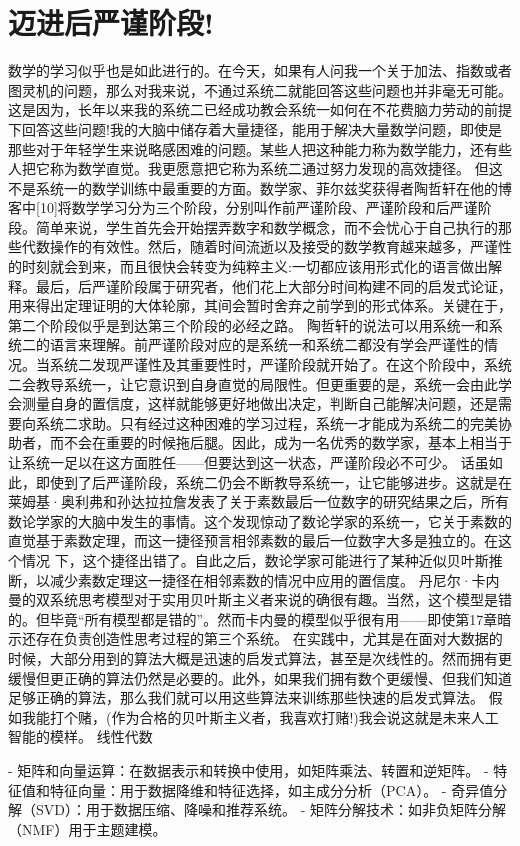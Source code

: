 \section{迈进后严谨阶段!}
数学的学习似乎也是如此进行的。在今天，如果有人问我一个关于加法、指数或者图灵机的问题，那么对我来说，不通过系统二就能回答这些问题也并非毫无可能。这是因为，长年以来我的系统二已经成功教会系统一如何在不花费脑力劳动的前提下回答这些问题!我的大脑中储存着大量捷径，能用于解决大量数学问题，即使是那些对于年轻学生来说略感困难的问题。某些人把这种能力称为数学能力，还有些人把它称为数学直觉。我更愿意把它称为系统二通过努力发现的高效捷径。
但这不是系统一的数学训练中最重要的方面。数学家、菲尔兹奖获得者陶哲轩在他的博客中[10]将数学学习分为三个阶段，分别叫作前严谨阶段、严谨阶段和后严谨阶段。简单来说，学生首先会开始摆弄数字和数学概念，而不会忧心于自己执行的那些代数操作的有效性。然后，随着时间流逝以及接受的数学教育越来越多，严谨性的时刻就会到来，而且很快会转变为纯粹主义:一切都应该用形式化的语言做出解释。最后，后严谨阶段属于研究者，他们花上大部分时间构建不同的启发式论证，用来得出定理证明的大体轮廓，其间会暂时舍弃之前学到的形式体系。关键在于，第二个阶段似乎是到达第三个阶段的必经之路。
陶哲轩的说法可以用系统一和系统二的语言来理解。前严谨阶段对应的是系统一和系统二都没有学会严谨性的情况。当系统二发现严谨性及其重要性时，严谨阶段就开始了。在这个阶段中，系统二会教导系统一，让它意识到自身直觉的局限性。但更重要的是，系统一会由此学会测量自身的置信度，这样就能够更好地做出决定，判断自己能解决问题，还是需要向系统二求助。只有经过这种困难的学习过程，系统一才能成为系统二的完美协助者，而不会在重要的时候拖后腿。因此，成为一名优秀的数学家，基本上相当于让系统一足以在这方面胜任——但要达到这一状态，严谨阶段必不可少。
话虽如此，即使到了后严谨阶段，系统二仍会不断教导系统一，让它能够进步。这就是在莱姆基·奥利弗和孙达拉拉詹发表了关于素数最后一位数字的研究结果之后，所有数论学家的大脑中发生的事情。这个发现惊动了数论学家的系统一，它关于素数的直觉基于素数定理，而这一捷径预言相邻素数的最后一位数字大多是独立的。在这个情况
下，这个捷径出错了。自此之后，数论学家可能进行了某种近似贝叶斯推断，以减少素数定理这一捷径在相邻素数的情况中应用的置信度。
丹尼尔·卡内曼的双系统思考模型对于实用贝叶斯主义者来说的确很有趣。当然，这个模型是错的。但毕竟“所有模型都是错的”。然而卡内曼的模型似乎很有用——即使第17章暗示还存在负责创造性思考过程的第三个系统。
在实践中，尤其是在面对大数据的时候，大部分用到的算法大概是迅速的启发式算法，甚至是次线性的。然而拥有更缓慢但更正确的算法仍然是必要的。此外，如果我们拥有数个更缓慢、但我们知道足够正确的算法，那么我们就可以用这些算法来训练那些快速的启发式算法。
假如我能打个赌，(作为合格的贝叶斯主义者，我喜欢打赌!)我会说这就是未来人工智能的模样。
线性代数

- 矩阵和向量运算：在数据表示和转换中使用，如矩阵乘法、转置和逆矩阵。
- 特征值和特征向量：用于数据降维和特征选择，如主成分分析（PCA）。
- 奇异值分解（SVD）：用于数据压缩、降噪和推荐系统。
- 矩阵分解技术：如非负矩阵分解（NMF）用于主题建模。

\nocite{*}
\printbibliography[heading=bibintoc, title=\ebibname]

\newpage
